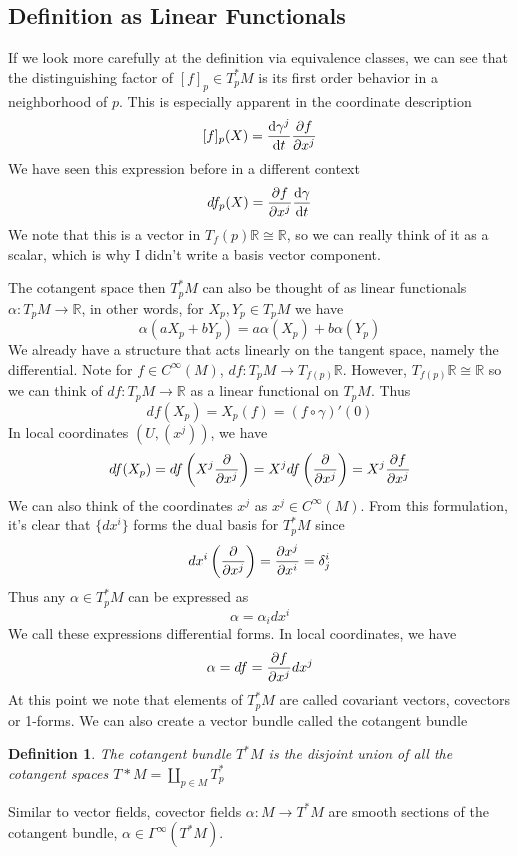 \documentclass[a4paper]{article}
\newtheorem*{defn}{Definition}
\begin{document}
\subsection*{Definition as Linear Functionals}%
  
If we look more carefully at the definition via equivalence classes, we can see that the distinguishing factor of $[f]_p \in T_p^*M$ is its first order behavior in a neighborhood of $p$. This is especially apparent in the coordinate description
\[
  [f]_p(X) = \dv{\gamma^j}{t}\pdv{f}{x^j}
\]
We have seen this expression before in a different context
\[
  df_p(X) = \pdv{f}{x^j}\dv{\gamma}{t}
\]
We note that this is a vector in $T_f(p)\mathds{R} \cong \mathds{R}$, so we can really think of it as a scalar, which is why I didn't write a basis vector component.

The cotangent space then $T_p^*M$ can also be thought of as linear functionals $\alpha: T_pM \rightarrow \mathds{R}$, in other words, for $X_p,Y_p \in T_pM$ we have
  \[
    \alpha(a X_p + b Y_p) = a \alpha(X_p) + b \alpha(Y_p) 
  \]
  We already have a structure that acts linearly on the tangent space, namely the differential. Note for  $f \in C^{\infty}(M)$, $df: T_pM \rightarrow T_{f(p)}\mathds{R}$. However, $T_{f(p)}\mathds{R} \cong \mathds{R}$ so we can think of $df: T_pM \rightarrow \mathds{R}$ as a linear functional on $T_pM$. Thus 
  \[
    df(X_p) = X_p(f) = (f \circ \gamma)'(0)
  \]
  In local coordinates $(U, (x^j))$, we have
  \[
    df(X_p) = df \left(X^j \pdv{x^j} \right) = X^j df \left( \pdv{x^j} \right) = X^j \pdv{f}{x^j}
  \]
  We can also think of the coordinates $x^j$ as $x^j \in C^{\infty}(M)$. From this formulation, it's clear that $\{dx^i\}$ forms the dual basis for $T^*_pM$ since
  \[
    dx^i \left( \pdv{x^j} \right) = \pdv{x^j}{x^i} = \delta^i_j
  \]
  Thus any $\alpha \in T_p^*M$ can be expressed as 
  \[
    \alpha = \alpha_i dx^i
  \]
  We call these expressions differential forms. In local coordinates, we have
  \[
    \alpha = df = \pdv{f}{x^j} dx^j
  \]
  At this point we note that elements of $T_p^*M$ are called covariant vectors, covectors or 1-forms. We can also create a vector bundle called the cotangent bundle
   \begin{defn}
     The cotangent bundle $T^*M$ is the disjoint union of all the cotangent spaces $T*M = \coprod_{p \in M} T^*_p$
   \end{defn}
  
  Similar to vector fields, covector fields $\alpha: M \rightarrow T^*M$ are smooth sections of the cotangent bundle, $\alpha \in \Gamma^{\infty}(T^*M)$.
\end{document}
